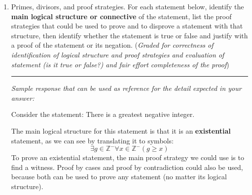 \documentclass[12pt, oneside]{article}
\begin{document}
\begin{enumerate}[labelindent=0pt, leftmargin=0pt]
    In this question, we'll consider the combination of these functions with a new function, one 
    that removes the element at the front of the list (if there is any). We define $remove: L \to L$
    by
    \[
        \begin{array}{ll}
            \textrm{Basis Step: } & remove([]) = [] \\
            \textrm{Recursive Step: } & \textrm{If } l \in L\textrm{ and }n \in \mathbb{N} \textrm{, then } remove(~(n, l)~) = l
        \end{array}        
    \]
    \begin{enumerate}
        \item What is the result of $remove(~append(~(prepend~(~(~(10,[]), 5~)~), 20)~)~)$? 
        For full credit, include all intermediate steps with brief justifications for each.
        \item Prove the statement
        \[
            \forall l \in L \left(~ remove( prepend(~(l,0)~)) = l ~\right) 
        \]
        \item Disprove the statement
        \[
            \forall l \in L \left(~ remove( append(~(l,0)~)) = l ~\right) 
        \]
    \end{enumerate}

    \item Primes, divisors, and proof strategies. For each statement below, identify the {\bf main logical structure or connective} of the 
    statement, list the proof strategies that could be used to prove and to disprove a statement with that structure, 
    then identify whether the statement is true or false and justify with a proof of the statement or its negation. 
    ({\it Graded for correctness of identification of logical structure and proof strategies and evaluation of statement (is it true or false?) 
    and fair effort completeness of the proof}) 


    \rule{0.5\textwidth}{.4pt}
    
    {\it Sample response that can be used as reference for the detail expected 
    in your answer:} 

    Consider the statement: There is a greatest negative integer.

    The main logical structure for this statement is that it is an {\bf existential} statement, as we can 
    see by translating it to symbols: 
    \[
        \exists g \in \mathbb{Z}^{-} \forall x \in \mathbb{Z}^{-} ( g \geq x)
    \]
    To prove an existential statement, the main proof strategy we could use is to find a witness. 
    Proof by cases and proof by contradiction could also be used, because 
    both can be used to prove any statement (no matter its logical structure).


\end{enumerate}
\end{document}
